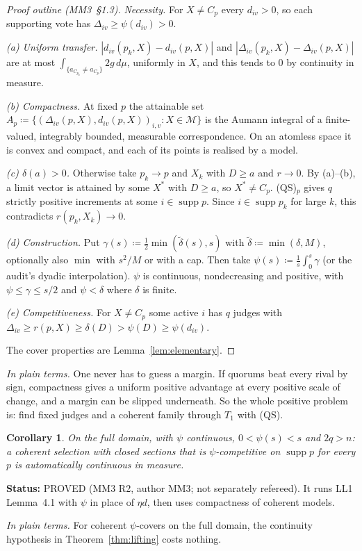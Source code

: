 \documentclass[11pt]{article}
\newtheorem{corollary}[theorem]{Corollary}
\theoremstyle{definition}
\theoremstyle{remark}
\newcommand{\M}{\mathcal M}
\newcommand{\supp}{\operatorname{supp}}
\newcommand{\src}[1]{\textsf{#1}}
\newcommand{\status}[1]{\par\smallskip\noindent\textbf{Status:} #1\par}
\newcommand{\inwords}[1]{\noindent\textit{In plain terms.} #1\par\smallskip}
\newcommand{\QS}{\textup{(QS)}}
\begin{document}
\begin{proof}[Proof outline (\src{MM3}~\S1.3)]
\emph{Necessity.} For $X\ne C_p$ every $d_{iv}>0$, so each supporting vote has $\Delta_{iv}\ge\psi(d_{iv})>0$.

\emph{(a) Uniform transfer.} $|d_{iv}(p_k,X)-d_{iv}(p,X)|$ and $|\Delta_{iv}(p_k,X)-\Delta_{iv}(p,X)|$ are at most $\int_{\{a_{C_{p_k}}\ne a_{C_p}\}}2g\,d\mu$, uniformly in $X$, and this tends to $0$ by continuity in measure.

\emph{(b) Compactness.} At fixed $p$ the attainable set $A_p\coloneqq\{(\Delta_{iv}(p,X),d_{iv}(p,X))_{i,v}:X\in\M\}$ is the Aumann integral of a finite-valued, integrably bounded, measurable correspondence. On an atomless space it is convex and compact, and each of its points is realised by a model.

\emph{(c) $\delta(a)>0$.} Otherwise take $p_k\to p$ and $X_k$ with $D\ge a$ and $r\to0$. By (a)--(b), a limit vector is attained by some $X^*$ with $D\ge a$, so $X^*\ne C_p$. \QS$_p$ gives $q$ strictly positive increments at some $i\in\supp p$. Since $i\in\supp p_k$ for large $k$, this contradicts $r(p_k,X_k)\to0$.

\emph{(d) Construction.} Put $\gamma(s)\coloneqq\frac12\min(\tilde\delta(s),s)$ with $\tilde\delta\coloneqq\min(\delta,M)$, optionally also $\min$ with $s^2/M$ or with a cap. Then take $\psi(s)\coloneqq\frac1s\int_0^s\gamma$ (or the audit's dyadic interpolation). $\psi$ is continuous, nondecreasing and positive, with $\psi\le\gamma\le s/2$ and $\psi<\delta$ where $\delta$ is finite.

\emph{(e) Competitiveness.} For $X\ne C_p$ some active $i$ has $q$ judges with $\Delta_{iv}\ge r(p,X)\ge\delta(D)>\psi(D)\ge\psi(d_{iv})$.

The cover properties are Lemma~\ref{lem:elementary}.
\end{proof}
\inwords{One never has to guess a margin. If quorums beat every rival by sign, compactness gives a uniform positive advantage at every positive scale of change, and a margin can be slipped underneath. So the whole positive problem is: find fixed judges and a coherent family through $T_1$ with \QS.}

\begin{corollary}\label{cor:R2}
On the full domain, with $\psi$ continuous, $0<\psi(s)<s$ and $2q>n$: a coherent selection with closed sections that is $\psi$-competitive on $\supp p$ for every $p$ is automatically continuous in measure.
\end{corollary}
\status{PROVED (\src{MM3} R2, author \src{MM3}; not separately refereed). It runs \src{LL1} Lemma~4.1 with $\psi$ in place of $\eta d$, then uses compactness of coherent models.}
\inwords{For coherent $\psi$-covers on the full domain, the continuity hypothesis in Theorem~\ref{thm:lifting} costs nothing.}
\end{document}
